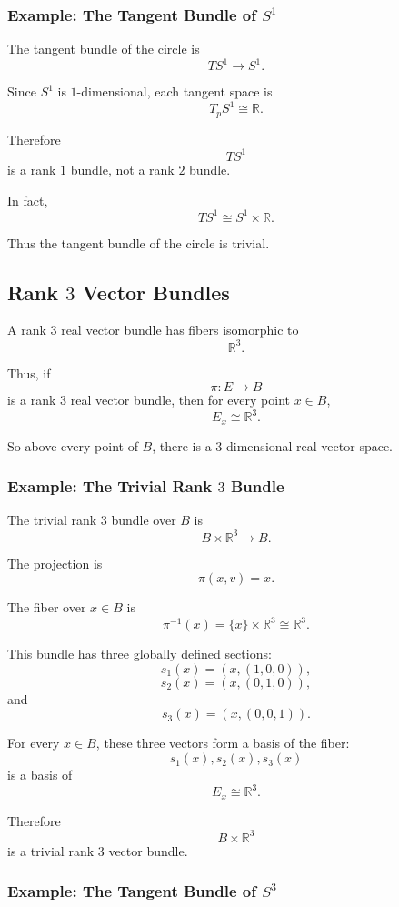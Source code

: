 \documentclass[12pt,a4paper]{article}
\theoremstyle{notespace}
\begin{document}
\subsubsection{Example: The Tangent Bundle of \(S^1\)}

The tangent bundle of the circle is
\[
TS^1\longrightarrow S^1.
\]

Since \(S^1\) is \(1\)-dimensional, each tangent space is
\[
T_pS^1\cong \mathbb R.
\]

Therefore
\[
TS^1
\]
is a rank \(1\) bundle, not a rank \(2\) bundle.

In fact,
\[
TS^1\cong S^1\times \mathbb R.
\]

Thus the tangent bundle of the circle is trivial.

\subsection{Rank \(3\) Vector Bundles}

A rank \(3\) real vector bundle has fibers isomorphic to
\[
\mathbb R^3.
\]

Thus, if
\[
\pi:E\to B
\]
is a rank \(3\) real vector bundle, then for every point \(x\in B\),
\[
E_x\cong \mathbb R^3.
\]

So above every point of \(B\), there is a \(3\)-dimensional real vector space.

\subsubsection{Example: The Trivial Rank \(3\) Bundle}

The trivial rank \(3\) bundle over \(B\) is
\[
B\times \mathbb R^3\longrightarrow B.
\]

The projection is
\[
\pi(x,v)=x.
\]

The fiber over \(x\in B\) is
\[
\pi^{-1}(x)=\{x\}\times \mathbb R^3\cong \mathbb R^3.
\]

This bundle has three globally defined sections:
\[
s_1(x)=(x,(1,0,0)),
\]
\[
s_2(x)=(x,(0,1,0)),
\]
and
\[
s_3(x)=(x,(0,0,1)).
\]

For every \(x\in B\), these three vectors form a basis of the fiber:
\[
s_1(x),s_2(x),s_3(x)
\]
is a basis of
\[
E_x\cong \mathbb R^3.
\]

Therefore
\[
B\times \mathbb R^3
\]
is a trivial rank \(3\) vector bundle.

\subsubsection{Example: The Tangent Bundle of \(S^3\)}
\end{document}
